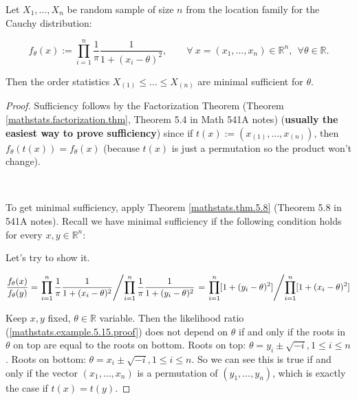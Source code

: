 \begin{example} Let \(X_1, \ldots, X_n\) be random sample of size \(n\) from the location family for the Cauchy distribution:

\[
f_\theta(x) := \prod_{i=1}^n \frac{1}{\pi} \frac{1}{1 + (x_i - \theta)^2}, \qquad \forall \ x = (x_1, \ldots, x_n) \in \mathbb{R}^n, \ \ \forall \theta \in \mathbb{R}.
\]

Then the order statistics \(X_{(1)} \leq \ldots \leq X_{(n)}\) are minimal sufficient for \(\theta\). 

\begin{proof} Sufficiency follows by the Factorization Theorem (Theorem \ref{mathstats.factorization.thm}, Theorem 5.4 in Math 541A notes) (\textbf{usually the easiest way to prove sufficiency}) since if \(t(x) := (x_{(1)}, \ldots, x_{(n)})\), then \(f_\theta(t(x)) = f_\theta(x)\) (because \(t(x)\) is just a permutation so the product won't change).

\

To get minimal sufficiency, apply Theorem \ref{mathstats.thm.5.8} (Theorem 5.8 in 541A notes). Recall we have minimal sufficiency if the following condition holds for every \(x, y \in \mathbb{R}^n\):

\noindent{}

Let's try to show it.

\begin{equation}\label{mathstats.example.5.15.proof}
\frac{f_\theta(x)}{f_\theta(y)} = \left. \prod_{i=1}^n \frac{1}{\pi} \frac{1}{1 + (x_i - \theta)^2} \middle/  \prod_{i=1}^n \frac{1}{\pi} \frac{1}{1 + (y_i - \theta)^2} \right. = \left. \prod_{i=1}^n[ 1 + (y_i - \theta)^2] \middle/  \prod_{i=1}^n[1 + (x_i - \theta)^2] \right.
\end{equation}

Keep \(x, y\) fixed, \(\theta \in \mathbb{R}\) variable. Then the likelihood ratio (\ref{mathstats.example.5.15.proof}) does not depend on \(\theta\) if and only if the roots in \(\theta\) on top are equal to the roots on bottom. Roots on top: \(\theta = y_i \pm \sqrt{-i}, 1 \leq i \leq n\). Roots on bottom: \(\theta = x_i \pm \sqrt{-i}, 1 \leq i \leq n\). So we can see this is true if and only if the vector \((x_1, \ldots, x_n)\) is a permutation of \((y_1, \ldots, y_n)\), which is exactly the case if \(t(x) = t(y)\).


\end{proof}
\end{example}
